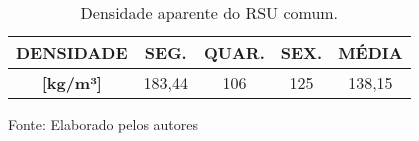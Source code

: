 \begin{table}[htbp]
\caption{Densidade aparente do RSU comum.}
\begin{center}
\begin{tabular}{|c|c|c|c|c|}
\hline
\textbf{DENSIDADE} & \textbf{SEG.} & \textbf{QUAR.} & \textbf{SEX.} & \textbf{MÉDIA} \\ \hline
\textbf{[kg/m³]} & 183,44 & 106 & 125 & 138,15 \\ \hline
\end{tabular}
Fonte: Elaborado pelos autores
\end{center}
\label{tab:densidade}
\end{table}
